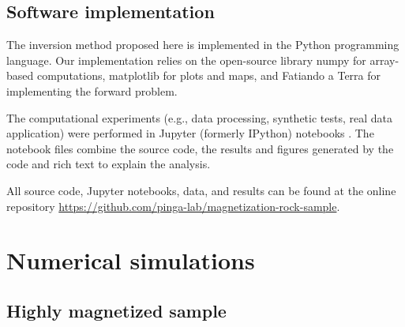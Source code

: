 \documentclass[draft,gc]{agutex}
\begin{document}
\begin{article}
\subsection{Software implementation}
\label{subsec:Software implementation}

The inversion method proposed here is implemented in the Python programming
language.
Our implementation relies on the open-source library
numpy \citep[][ \url{http://scipy.org}]{jones2001, walt2011}
for array-based computations,
matplotlib \citep[][ \url{http://matplotlib.org}]{hunter2007}
for plots and maps,
and Fatiando a Terra \citep[][ \url{http://www.fatiando.org}]{uieda2013}
for implementing the forward problem.

The computational experiments
(e.g., data processing, synthetic tests, real data application)
were performed in
Jupyter (formerly IPython) notebooks
\citep[][ \url{http://jupyter.org}]{perez2007}.
The notebook files combine the source code,
the results and figures generated by the code
and rich text to explain the analysis.

All source code, Jupyter notebooks, data, and results
can be found at the online repository
\url{https://github.com/pinga-lab/magnetization-rock-sample}.

\section{Numerical simulations}
\label{sec:Numerical simulations}

\subsection{Highly magnetized sample}


\end{article}
\end{document}
